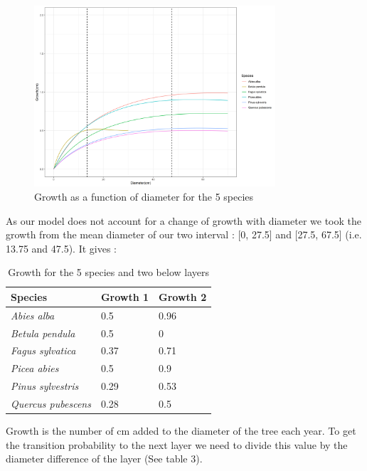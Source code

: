 \documentclass{article}
\begin{document}
\begin{figure}
    \centering
    \includegraphics[width=0.8\textwidth]{Figure/Growth_diameter.png}
    \caption{Growth as a function of diameter for the 5 species}
    \label{fig:my_label}
\end{figure}

As our model does not account for a change of growth with diameter we took the growth from the mean diameter of our two interval : [0, 27.5] and [27.5, 67.5] (i.e. 13.75 and 47.5). It gives :

\begin{table}[H]
\begin{center}
    \begin{tabular}{lll}
    \hline
    Species & Growth 1 & Growth 2 \\ \hline
    \textit{Abies alba} & 0.5 & 0.96 \\
    \textit{Betula pendula} & 0.5 & 0 \\
    \textit{Fagus sylvatica} & 0.37 & 0.71 \\
    \textit{Picea abies} & 0.5 & 0.9 \\
    \textit{Pinus sylvestris} & 0.29 & 0.53 \\
    \textit{Quercus pubescens} & 0.28 & 0.5 \\ \hline
    \end{tabular}
    \caption{Growth for the 5 species and two below layers}
\end{center}
\end{table}

Growth is the number of cm added to the diameter of the tree each year. To get the transition probability to the next layer we need to divide this value by the diameter difference of the layer (See table 3).
\end{document}
